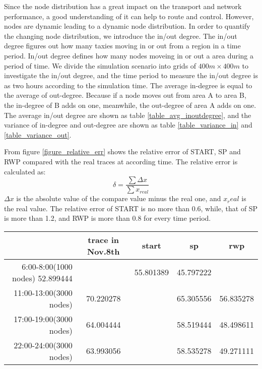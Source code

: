 Since the node distribution has a great impact on the transport and network performance, a good understanding of it can help to route and control.  However, nodes are dynamic leading to a dynamic node distribution. In order to quantify the changing node distribution,  we introduce the in/out degree. The in/out degree figures out how many taxies moving in or out from a region in a time period. In/out degree defines how many nodes moveing in or out a area during a period of time. 
We divide the simulation scenario into grids of $ 400m \times 400 m$ to investigate the in/out degree, and the time period to measure the in/out degree is as two hours according to the simulation time. 
The average in-degree is equal to the average of out-degree. Because if a node moves out from area A to area B, the in-degree of B adds on one, meanwhile, the out-degree of area A adds on one. The average in/out degree are shown as table \ref{table_avg_inoutdegree}, and the variance of in-degree and out-degree are shown as table \ref{table_variance_in} and \ref{table_variance_out}.

From figure \ref{figure_relative_err} shows the relative error of START, SP and RWP compared with the real traces at according time.
The relative error is calculated as:
\begin{equation}
    \delta = \frac{\sum \Delta x}{\sum x_{real}} 
\end{equation}
$\Delta x$ is the absolute value of the compare value minus the real one, and $x_real$ is the real value.
The relative error of START is no more than 0.6, while, that of SP is more than 1.2,  and RWP is more than 0.8 for every time period. 
\begin{table*}[!t]
\caption{Average in/out degree.}\label{table_avg_inoutdegree}
\centering
\begin{tabular}{r|c|c|c|c}
\hline
	&trace in Nov.8th	&start	&sp	&rwp	\\
\hline
6:00-8:00(1000 nodes)
52.899444&&55.801389	&45.797222\\
\hline
11:00-13:00(3000 nodes)&
70.220278&&	65.305556&	56.835278\\  
\hline
17:00-19:00(3000 nodes)&
64.004444&&	58.519444&	48.498611\\
\hline
22:00-24:00(3000 nodes)&
63.993056&&	58.535278&	49.271111\\	
\hline
\end{tabular}
\end{table*}

